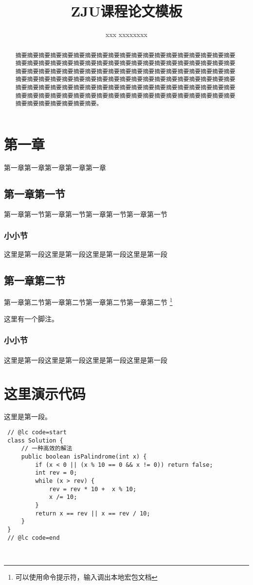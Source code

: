 \documentclass[lang=cn,11pt,a4paper,cite=numbers]{elegantpaper}
\title{ZJU课程论文模板}
\author{xxx  xxxxxxxx}
\institute{浙江大学软件学院}
\date{}
\begin{document}
\maketitle

\begin{abstract}摘要摘要摘要摘要摘要摘要摘要摘要摘要摘要摘要摘要摘要摘要摘要摘要摘要摘要摘要摘要摘要摘要摘要摘要摘要摘要摘要摘要摘要摘要摘要摘要摘要摘要摘要摘要摘要摘要摘要摘要摘要摘要摘要摘要摘要摘要摘要摘要摘要摘要摘要摘要摘要摘要摘要摘要摘要摘要摘要摘要摘要摘要摘要摘要摘要摘要摘要摘要摘要摘要摘要摘要摘要摘要摘要摘要摘要摘要摘要摘要摘要摘要摘要摘要摘要摘要摘要摘要摘要摘要摘要摘要摘要摘要摘要摘要摘要摘要摘要摘要摘要摘要摘要摘要摘要摘要摘要摘要摘要摘要摘要摘要摘要摘要摘要摘要摘要摘要摘要摘要摘要。
\end{abstract}

\section{第一章}
第一章第一章第一章第一章第一章
\subsection{第一章第一节}
第一章第一节第一章第一节第一章第一节第一章第一节
\subsubsection{小小节}
这里是第一段这里是第一段这里是第一段这里是第一段

\subsection{第一章第二节}
第一章第二节第一章第二节第一章第二节第一章第二节 \footnote{可以使用命令提示符，输入调出本地宏包文档}

这里有一个脚注。
\subsubsection{小小节}
\paragraph{}这里是第一段这里是第一段这里是第一段这里是第一段


\section{这里演示代码}
这里是第一段。
\begin{lstlisting}
 // @lc code=start
 class Solution {
     // 一种高效的解法
     public boolean isPalindrome(int x) {
         if (x < 0 || (x % 10 == 0 && x != 0)) return false;
         int rev = 0;
         while (x > rev) {
             rev = rev * 10 +  x % 10;
             x /= 10;
         }
         return x == rev || x == rev / 10;
     } 
 }
 // @lc code=end
 
 
\end{lstlisting}
\end{document}
